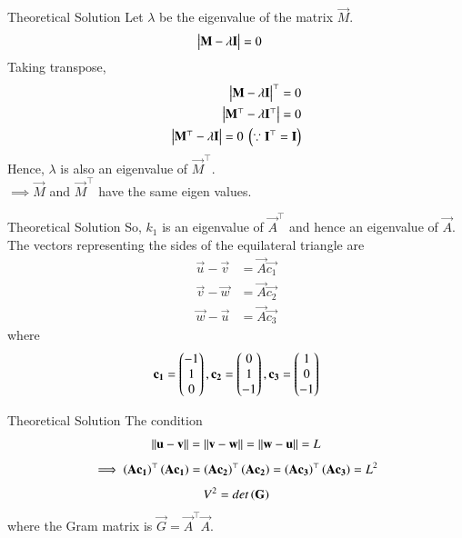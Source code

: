 \documentclass{beamer}
\begin{document}
\begin{frame}{Theoretical Solution}
Let $\lambda$ be the eigenvalue of the matrix $\vec{M}$.
\begin{align}
	\begin{vmatrix}\mathbf{M}-\lambda\mathbf{I}\end{vmatrix} &= 0
\end{align}
Taking transpose,
\begin{align}
	\begin{vmatrix}\mathbf{M}-\lambda\mathbf{I}\end{vmatrix}^\top = 0 \\
	\begin{vmatrix}\mathbf{M}^\top-\lambda\mathbf{I}^\top\end{vmatrix} = 0 \\
	\begin{vmatrix}\mathbf{M}^\top-\lambda\mathbf{I}\end{vmatrix} = 0\text{ }\left(\because \mathbf{I}^\top=\mathbf{I}\right)
\end{align}
Hence, $\lambda$ is also an eigenvalue of $\vec{M}^\top$. \\
$\implies \vec{M}$ and $\vec{M}^\top$ have the same eigen values. \\
\end{frame}

\begin{frame}{Theoretical Solution}
So, $k_1$ is an eigenvalue of $\vec{A}^\top$ and hence an eigenvalue of $\vec{A}$. \\
The vectors representing the sides of the equilateral triangle are
\begin{align}
    \vec{u} - \vec{v} &= \vec{A}\vec{c_1} \label{eq:1} \\
    \vec{v} - \vec{w} &= \vec{A}\vec{c_2} \label{eq:2} \\
    \vec{w} - \vec{u} &= \vec{A}\vec{c_3} \label{eq:3}
\end{align}
where 
\begin{align}
	\mathbf{c_1} = \begin{pmatrix}-1 \\ 1 \\ 0\end{pmatrix}, \mathbf{c_2} = \begin{pmatrix}0 \\ 1 \\ -1\end{pmatrix}, \mathbf{c_3} = \begin{pmatrix}1 \\ 0 \\ -1\end{pmatrix}
\end{align}
\end{frame}

\begin{frame}{Theoretical Solution}
The condition 
\begin{align}
	\left\lVert\mathbf{u} - \mathbf{v}\right\rVert = \left\lVert\mathbf{v} - \mathbf{w}\right\rVert = \left\lVert\mathbf{w} - \mathbf{u}\right\rVert = L
\end{align}
\begin{align}
    \implies \left(\mathbf{A}\mathbf{c_1}\right)^\top\left(\mathbf{A}\mathbf{c_1}\right) = \left(\mathbf{A}\mathbf{c_2}\right)^\top\left(\mathbf{A}\mathbf{c_2}\right) = \left(\mathbf{A}\mathbf{c_3}\right)^\top\left(\mathbf{A}\mathbf{c_3}\right) = L^2 \label{eq:gram}
\end{align}
\begin{align}
    V^2 = det\left(\mathbf{G}\right) 
\end{align}
where the Gram matrix is $\vec{G} = \vec{A}^\top\vec{A}$.
\end{frame}
\end{document}
